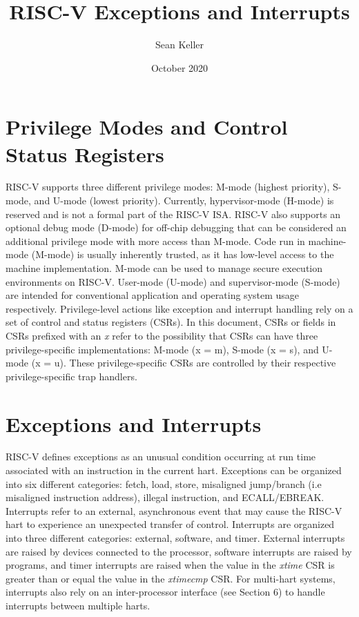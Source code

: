 \documentclass[12pt]{article}
\title{RISC-V Exceptions and Interrupts}
\author{Sean Keller}
\date{October 2020}
\begin{document}
\maketitle
\newpage

\section{Privilege Modes and Control Status Registers}
RISC-V supports three different privilege modes: M-mode (highest priority), S-mode, and U-mode (lowest priority). Currently, hypervisor-mode (H-mode) is reserved and is not a formal part of the RISC-V ISA. RISC-V also supports an optional debug mode (D-mode) for off-chip debugging that can be considered an additional privilege mode with more access than M-mode. Code run in machine-mode (M-mode) is usually inherently trusted, as it has low-level access to the machine implementation. M-mode can be used to manage secure execution environments on RISC-V. User-mode (U-mode) and supervisor-mode (S-mode) are intended for conventional application and operating system usage respectively. Privilege-level actions like exception and interrupt handling rely on a set of control and status registers (CSRs). In this document, CSRs or fields in CSRs prefixed with an \emph{x} refer to the possibility that CSRs can have three privilege-specific implementations: M-mode (x = m), S-mode (x = s), and U-mode (x = u). These privilege-specific CSRs are controlled by their respective privilege-specific trap handlers.

\section{Exceptions and Interrupts}
RISC-V defines exceptions as an unusual condition occurring at run time associated with an instruction in the current hart. Exceptions can be organized into six different categories: fetch, load, store, misaligned jump/branch (i.e misaligned instruction address), illegal instruction, and ECALL/EBREAK. Interrupts refer to an external, asynchronous event that may cause the RISC-V hart to experience an unexpected transfer of control. Interrupts are organized into three different categories: external, software, and timer. External interrupts are raised by devices connected to the processor, software interrupts are raised by programs, and timer interrupts are raised when the value in the \emph{xtime} CSR is greater than or equal the value in the \emph{xtimecmp} CSR. For multi-hart systems, interrupts also rely on an inter-processor interface (see Section 6) to handle interrupts between multiple harts.
\end{document}
